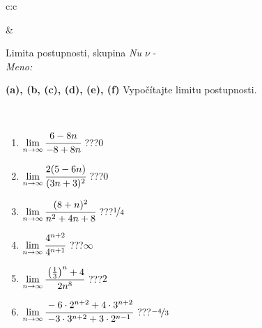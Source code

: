 \documentclass[10pt]{report}
\begin{document}
\begin{tabular}{c:c}
\begin{minipage}[c][104.5mm][t]{0.5\linewidth}
\begin{center}
\begin{minipage}{0.20\linewidth}
\begin{center}
\end{center}
\end{minipage}
\end{center}
\end{minipage}
&
\begin{minipage}[c][104.5mm][t]{0.5\linewidth}
\begin{center}
\vspace{5mm}
{\huge Limita postupnosti, skupina \textit{Nu $\nu$} -}\\[5mm]
\textit{Meno:}\phantom{xxxxxxxxxxxxxxxxxxxxxxxxxxxxxxxxxxxxxxxxxxxxxxxxxxxxxxxxxxxxxxxxx}\\[5mm]
\begin{minipage}{0.95\linewidth}
\begin{center}
{
\textbf{(a), (b, (c), (d), (e), (f)} Vypočítajte limitu postupnosti. \\[-1mm]
\phantom{x}
}
\end{center}
\end{minipage}
\\[1mm]
\begin{minipage}{0.79\linewidth}
\begin{center}
\begin{varwidth}{\linewidth}
\setlength{\itemsep}{0pt}
\begin{enumerate}
\normalsize
\item $\lim\limits_{n\to\infty}\cfrac{6-8n}{-8+8n}$\quad \dotfill\; ???\;\dotfill \quad $0$
\item $\lim\limits_{n\to\infty}\cfrac{2(5-6n)}{(3n+3)^2}$\quad \dotfill\; ???\;\dotfill \quad $0$
\item $\lim\limits_{n\to\infty}\cfrac{(8+n)^2}{n^2+4n+8}$\quad \dotfill\; ???\;\dotfill \quad $\nicefrac{1}{4}$
\item $\lim\limits_{n\to\infty}\cfrac{4^{n+2}}{4^{n+1}}$\quad \dotfill\; ???\;\dotfill \quad $\infty$
\item $\lim\limits_{n\to\infty}\cfrac{\left(\frac{1}{3}\right)^n +4}{2n^{8}}$\quad \dotfill\; ???\;\dotfill \quad $2$
\item $\lim\limits_{n\to\infty}\cfrac{-6\cdot 2^{n+2}+4\cdot 3^{n+2}}{-3\cdot 3^{n+2}+3\cdot 2^{n-1}}$\quad \dotfill\; ???\;\dotfill \quad $\nicefrac{-4}{3}$
\end{enumerate}
\end{varwidth}
\end{center}
\end{minipage}
\begin{minipage}{0.20\linewidth}
\begin{center}

\end{center}
\end{minipage}
\end{center}
\end{minipage}
\end{tabular}
\end{document}

